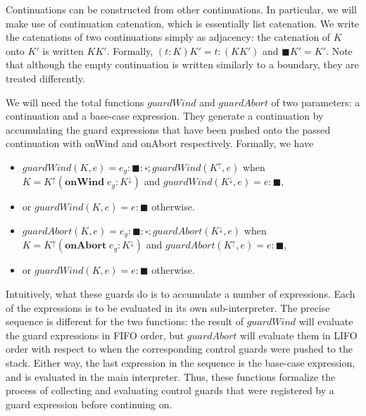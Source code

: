 \documentclass[11pt]{article}
\begin{document}
Continuations can be constructed from other continuations.
In particular, we will make use of continuation catenation, which is essentially list catenation.
We write the catenations of two continuations simply as adjacency: the catenation of $K$ onto $K'$ is written $KK'$.
Formally, $(t:K)K' = t:(KK')$ and $\blacksquare K' = K'$.
Note that although the empty continuation is written similarly to a boundary, they are treated differently.

We will need the total functions $guardWind$ and $guardAbort$ of two parameters: a continuation and a base-case expression.
They generate a continuation by accumulating the guard expressions that have been pushed onto the passed continuation with \textsf{onWind} and \textsf{onAbort} respectively.
Formally, we have
\begin{itemize}
\item $guardWind(K, e) = e_g : \blacksquare : \square; guardWind(K^\uparrow, e)$ when $K = K^\uparrow(\textbf{onWind}\;e_g:K^\downarrow)$ and $guardWind(K^\downarrow, e) = e:\blacksquare$,
\item or $guardWind(K, e) = e:\blacksquare$ otherwise.
\item $guardAbort(K, e) = e_g : \blacksquare : \square; guardAbort(K^\downarrow, e)$ when $K = {K^\uparrow(\textbf{onAbort}\;e_g:K^\downarrow)}$ and $guardAbort(K^\uparrow, e) = e:\blacksquare$,
\item or $guardWind(K, e) = e:\blacksquare$ otherwise.
\end{itemize}

Intuitively, what these guards do is to accumulate a number of expressions.
Each of the expressions is to be evaluated in its own sub-interpreter.
The precise sequence is different for the two functions: the result of $guardWind$ will evaluate the guard expressions in FIFO order, but $guardAbort$ will evaluate them in LIFO order with respect to when the corresponding control guards were pushed to the stack.
Either way, the last expression in the sequence is the base-case expression, and is evaluated in the main interpreter.
Thus, these functions formalize the process of collecting and evaluating control guards that were registered by a guard expression before continuing on.
\end{document}
